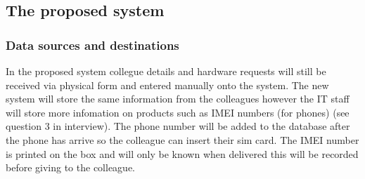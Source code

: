 \subsection{The proposed system}

\subsubsection{Data sources and destinations}

In the proposed system collegue details and hardware requests will still be received via physical form and entered manually onto the system. The new system will store the same information from the colleagues however the IT staff will store more infomation on products such as IMEI numbers (for phones) (see question 3 in interview). The phone number will be added to the database after the phone has arrive so the colleague can insert their sim card. The IMEI number is printed on the box and will only be known when delivered this will be recorded before giving to the colleague.

\newpage

